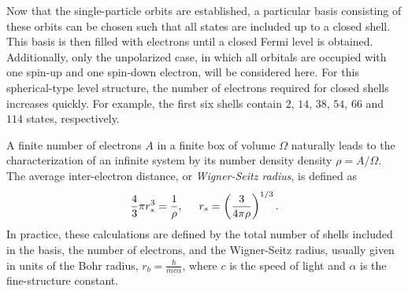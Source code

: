 \documentclass[thesis.tex]{subfiles}
\begin{document}
Now that the single-particle orbits are established, a particular basis consisting of these orbits can be chosen such that all states are included up to a closed shell.  This basis is then filled with electrons until a closed Fermi level is obtained.  Additionally, only the unpolarized case, in which all orbitals are occupied with one spin-up and one spin-down electron, will be considered here.  For this spherical-type level structure, the number of electrons required for closed shells increases quickly.  For example, the first six shells contain $2$, $14$, $38$, $54$, $66$ and $114$ states, respectively.

A finite number of electrons $A$ in a finite box of volume $\Omega$ naturally leads to the characterization of an infinite system by its number density density $\rho = A/\Omega$.  The average inter-electron distance, or \textit{Wigner-Seitz radius}, is defined as
\begin{equation} \label{wigner-seitz}
  \frac{4}{3}\pi r_{s}^{3} = \frac{1}{\rho},\hspace{0.5cm} r_{s} = \left(\frac{3}{4\pi\rho}\right)^{1/3}.
\end{equation}
In practice, these calculations are defined by the total number of shells included in the basis, the number of electrons, and the Wigner-Seitz radius, usually given in units of the Bohr radius, $r_{b} = \frac{\hbar}{mc\alpha}$, where $c$ is the speed of light and $\alpha$ is the fine-structure constant.
\end{document}
